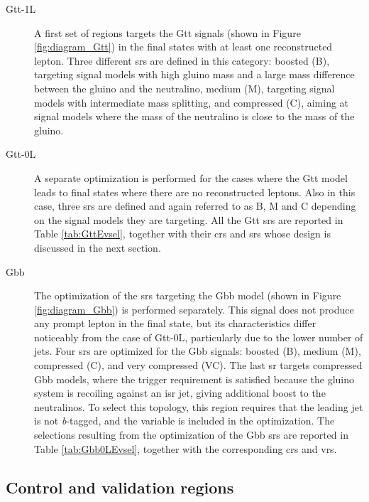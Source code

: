 \begin{description}

\item[Gtt-1L] A first set of regions targets the Gtt signals (shown in Figure \ref{fig:diagram_Gtt}) in the final states with at least one reconstructed lepton. Three different \glspl{sr} are defined in this category: boosted (B), targeting signal models with high gluino mass 
and a large mass difference between the gluino and the neutralino, medium (M), targeting signal models with intermediate mass splitting, and compressed (C), aiming at signal models where the mass of the neutralino is close to the mass of the gluino. 

\item[Gtt-0L] A separate optimization is performed for the cases where the Gtt model leads to final states where there are no reconstructed leptons.
Also in this case, three \glspl{sr} are defined and again referred to as B, M and C depending on the signal models they are targeting. 
All the Gtt \glspl{sr} are reported in Table \ref{tab:GttEvsel}, together with their \glspl{cr} and \glspl{sr} whose design is discussed in the next section. 

\item[Gbb] The optimization of the \glspl{sr} targeting the Gbb model (shown in Figure \ref{fig:diagram_Gbb}) is performed separately. 
This signal does not produce any prompt lepton in the final state, but its characteristics differ noticeably from 
the case of Gtt-0L, particularly due to the lower number of jets. 
Four \glspl{sr} are optimized for the Gbb signals: boosted (B), medium (M), compressed (C), and very compressed (VC). 
The last \gls{sr} targets compressed Gbb models, where the \met trigger requirement is satisfied because the gluino system is recoiling against 
an \gls{isr} jet, giving additional boost to the neutralinos. To select this topology, this region requires that the leading jet is
not \textit{b}-tagged, and 
the variable \dphilead is included in the optimization. The selections resulting from the optimization of the Gbb \glspl{sr} are 
reported in Table \ref{tab:Gbb0LEvsel}, together with the corresponding \glspl{cr} and \glspl{vr}.

\end{description}

\subsection{Control and validation regions}

